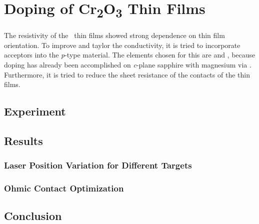 \section{Doping of \texorpdfstring{C\lowercase{r}\textsubscript{2}O\textsubscript{3}}{Cr2O3} Thin Films}
    \label{Sec:Results_Doping}
The resistivity of the \cro\ thin films showed strong dependence on thin film orientation.
To improve and taylor the conductivity, it is tried to incorporate acceptors into the \textit{p}-type material.
The elements chosen for this are  and , because doping has already been accomplished on \textit{c}-plane sapphire with magnesium via 
    \cite{farrell2015}.
Furthermore, it is tried to reduce the sheet resistance of the contacts of the thin films.

\subsection{Experiment}
    
\subsection{Results}
    \subsubsection{Laser Position Variation for Different Targets}
        
    \subsubsection{Ohmic Contact Optimization}
        
\subsection{Conclusion}
    